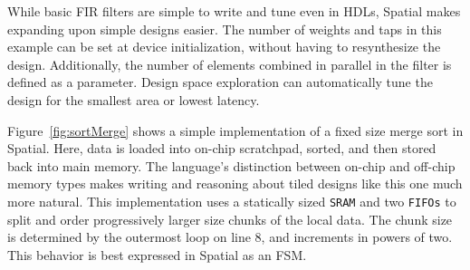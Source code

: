 While basic FIR filters are simple to write and tune even in HDLs, Spatial makes expanding upon simple designs easier. The number of weights and taps in this example can be set at device initialization, without having to resynthesize the design. Additionally, the number of elements combined in parallel in the filter is defined as a parameter. Design space exploration can automatically tune the design for the smallest area or lowest latency.

Figure~\ref{fig:sortMerge} shows a simple implementation of a fixed size merge sort in Spatial. Here, data is loaded into on-chip scratchpad, sorted, and then stored back into main memory.
The language's distinction between on-chip and off-chip memory types makes writing and reasoning about tiled designs like this one much more natural.
This implementation uses a statically sized \texttt{\small{SRAM}} and two \texttt{\small{FIFOs}} to split and order progressively larger size chunks of the local data.
The chunk size is determined by the outermost loop on line 8, and increments in powers of two. This behavior is best expressed in Spatial as an FSM.



